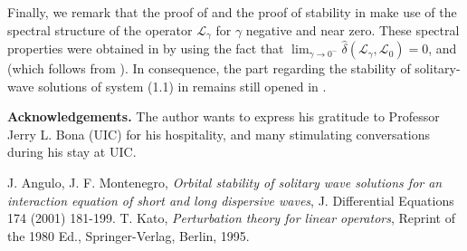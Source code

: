 \documentclass[10pt,reqno]{amsart}
\numberwithin{equation}{section}
\begin{document}
Finally, we remark that the proof of \cite[Lemma 2.7]{am:am} and 
the proof of stability in \cite[Theorem 2.1]{am:am} make use of 
the spectral structure of the operator $\mathcal{L}_{\gamma}$ 
for $\gamma$ negative and near zero.  These spectral properties 
were obtained in \cite[Lemma 2.4]{am:am} by using the fact  that  
$\lim_{\gamma \rightarrow 0^-}\hat \delta(\mathcal{L}_{\gamma},\mathcal{L}_0)=0$, 
and \cite[Theorem A.2]{am:am} (which follows from    
\cite[Theorem IV.3.16]{k:k}).  In consequence, the part regarding the stability 
of solitary-wave solutions of system (1.1) in \cite[Theorem 2.1]{am:am} 
remains still opened in \cite{am:am}. 

\vspace{0.5cm}
\noindent
{\bf{Acknowledgements.}}  The author wants to express his gratitude 
to Professor Jerry L. Bona (UIC) for his hospitality, and many 
stimulating conversations during his stay at UIC.


\begin{thebibliography}{99}
J. Angulo, J. F. Montenegro, \textit{Orbital stability
of solitary wave solutions for an interaction equation of short
and long dispersive waves},  J. Differential Equations 174 (2001) 181-199.
T. Kato, \textit{Perturbation theory for linear operators}, 
Reprint of the 1980 Ed., Springer-Verlag, Berlin, 1995.
\end{thebibliography}
\medskip
\end{document}
